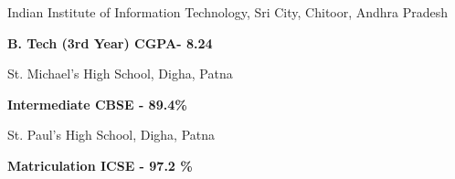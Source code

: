 \newcommand{\edu}[2]{%
  {\color{accent}#1\par}
  \smallskip\normalsize
  \ifstrequal{#2}{}{}{
  \textbf{\color{emphasis}#2}\par
  \smallskip}
  \normalsize
}




\edu{Indian Institute of Information Technology, Sri City, Chitoor, Andhra Pradesh }{B. Tech (3rd Year) \hspace{6} CGPA- 8.24}
\medskip
\medskip
\edu{St. Michael's High School, Digha, Patna}{Intermediate \hspace{6} CBSE - 89.4\% }
\medskip
\medskip
\edu{St. Paul's High School, Digha, Patna}{Matriculation \hspace{6} ICSE - 97.2 \% }


